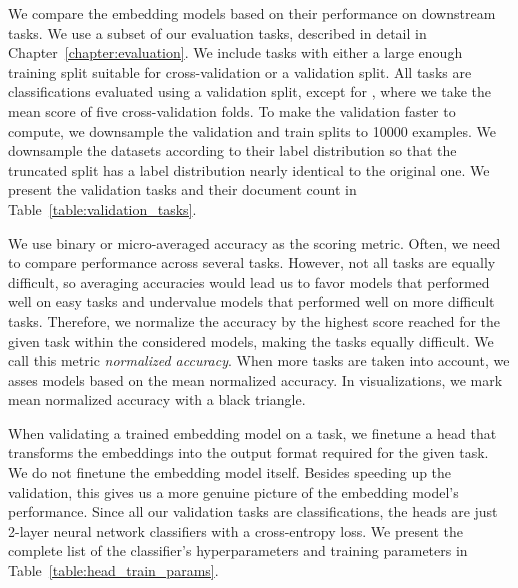 We compare the embedding models based on their performance on 
downstream tasks. We use a subset of our evaluation tasks, described in
detail in Chapter~\ref{chapter:evaluation}. We include tasks with either
a large enough training split suitable for cross-validation or a validation
split. All tasks are classifications evaluated using a validation
split, except for , where we take the mean score of five
cross-validation folds. To make the validation faster to compute, we downsample
the validation and train splits to 10000 examples. We downsample the datasets
according to their label distribution so that the truncated split has a label distribution nearly identical to the original one. We present the validation
tasks and their document count in Table~\ref{table:validation_tasks}.

We use binary or micro-averaged accuracy as the scoring metric. Often, we need
to compare performance across several tasks. However, not all tasks are equally
difficult, so averaging accuracies would lead us to favor models that
performed well on easy tasks and undervalue models that performed well on
more difficult tasks. Therefore, we normalize the accuracy by the highest
score reached for the given task within the considered models, 
making the tasks equally difficult. We call this metric \emph{normalized
accuracy}. When more tasks are taken into account, we asses models based on the
mean normalized accuracy. In visualizations, we mark mean normalized accuracy
with a black triangle.

When validating a trained embedding model on a task, we finetune a head that
transforms the embeddings into the output format required for the given task. We
do not finetune the embedding model itself. Besides speeding up the validation,
this gives us a more genuine picture of the embedding model's performance.
Since all our validation tasks are classifications, the heads are just 2-layer
neural network classifiers with a cross-entropy loss. We present the complete
list of the classifier's hyperparameters and training parameters in
Table~\ref{table:head_train_params}.

